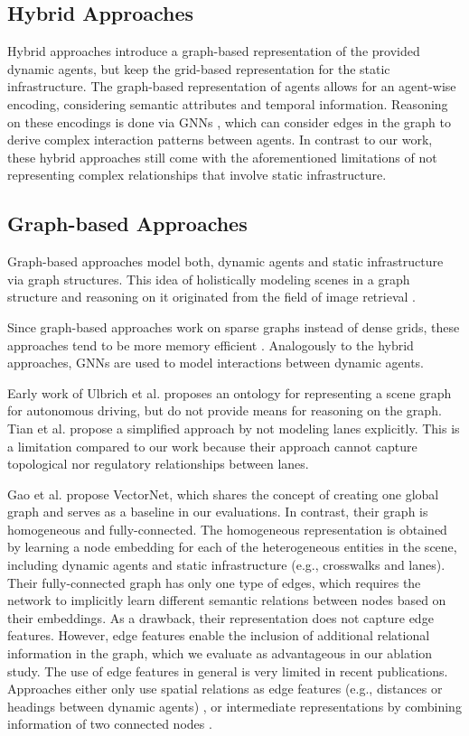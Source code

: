 \documentclass[letterpaper, 10 pt, journal, twoside]{IEEEtran}
\begin{document}
\subsection{Hybrid Approaches}
Hybrid approaches introduce a graph-based representation of the provided dynamic agents, but keep the grid-based representation for the static infrastructure.
The graph-based representation of agents allows for an agent-wise encoding, considering semantic attributes and temporal information.
Reasoning on these encodings is done via GNNs \cite{Salzmann2020, Tang2019, Gilles2021}, which can consider edges in the graph to derive complex interaction patterns between agents.
In contrast to our work, these hybrid approaches still come with the aforementioned limitations of not representing complex relationships that involve static infrastructure.

\subsection{Graph-based Approaches}
Graph-based approaches model both, dynamic agents and static infrastructure via graph structures.
This idea of holistically modeling scenes in a graph structure and reasoning on it originated from the field of image retrieval \cite{Johnson2015}.

Since graph-based approaches work on sparse graphs instead of dense grids, these approaches tend to be more memory efficient \cite{Khandelwal2020_ARXIV}.
Analogously to the hybrid approaches, GNNs are used to model interactions between dynamic agents.

Early work of Ulbrich et al. \cite{Ulbrich2014} proposes an ontology for representing a scene graph for autonomous driving, but do not provide means for reasoning on the graph.
Tian et al. \cite{Tian2020_ARXIV} propose a simplified approach by not modeling lanes explicitly.
This is a limitation compared to our work because their approach cannot capture topological nor regulatory relationships between lanes.

Gao et al. \cite{Gao2020} propose VectorNet, which shares the concept of creating one global graph and serves as a baseline in our evaluations.
In contrast, their graph is homogeneous and fully-connected.
The homogeneous representation is obtained by learning a node embedding for each of the heterogeneous entities in the scene, including dynamic agents and static infrastructure (e.g., crosswalks and lanes).
Their fully-connected graph has only one type of edges, which requires the network to implicitly learn different semantic relations between nodes based on their embeddings.
As a drawback, their representation does not capture edge features.
However, edge features enable the inclusion of additional relational information in the graph, which we evaluate as advantageous in our ablation study.
The use of edge features in general is very limited in recent publications.
Approaches either only use spatial relations as edge features (e.g., distances or headings between dynamic agents) \cite{Ma2019, Li2020a_ARXIV_IS_EQUAL_Li2021_ARXIV}, or intermediate representations by combining information of two connected nodes \cite{Li2020, Hu2022}.
\end{document}
